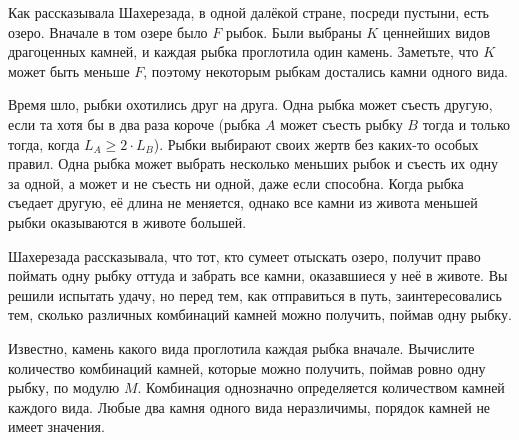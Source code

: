 Как рассказывала Шахерезада, в одной далёкой стране, посреди пустыни, есть
озеро. Вначале в том озере было $F$ рыбок. Были выбраны $K$ ценнейших видов
драгоценных камней, и каждая рыбка проглотила один камень. Заметьте, что
$K$ может быть меньше $F$, поэтому некоторым рыбкам достались камни одного
вида.

Время шло, рыбки охотились друг на друга. Одна рыбка может съесть другую,
если та хотя бы в два раза короче (рыбка $A$ может съесть рыбку $B$ тогда
и только тогда, когда $L_A \ge 2 \cdot L_B$). Рыбки выбирают своих жертв без
каких-то особых правил. Одна рыбка может выбрать несколько меньших рыбок
и съесть их одну за одной, а может и не съесть ни одной, даже если способна.
Когда рыбка съедает другую, её длина не меняется, однако все камни из живота
меньшей рыбки оказываются в животе большей.

Шахерезада рассказывала, что тот, кто сумеет отыскать озеро, получит право
поймать одну рыбку оттуда и забрать все камни, оказавшиеся у неё в животе.
Вы решили испытать удачу, но перед тем, как отправиться в путь,
заинтересовались тем, сколько различных комбинаций камней можно получить,
поймав одну рыбку.

Известно, камень какого вида проглотила каждая рыбка вначале. Вычислите
количество комбинаций камней, которые можно получить, поймав ровно одну рыбку,
по модулю $M$. Комбинация однозначно определяется количеством камней каждого
вида. Любые два камня одного вида неразличимы, порядок камней не имеет
значения.
